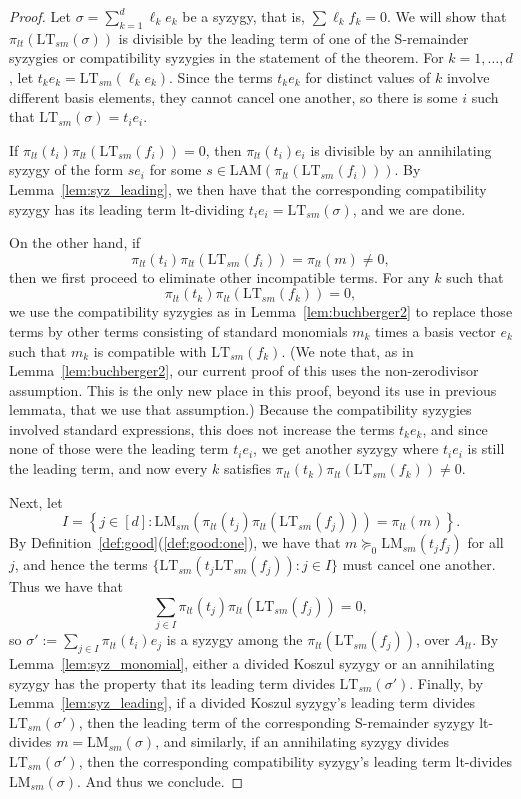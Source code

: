 \documentclass[11pt,reqno]{amsart}
\newcommand{\lmsm}{\text{LM}_{sm}}
\newcommand{\ltsm}{\text{LT}_{sm}}
\newcommand{\piltd}{\pi_{lt}}
\newcommand{\LAM}{\ensuremath{\text{LAM}}}
\theoremstyle{definition}
\numberwithin{equation}{section}
\begin{document}
\begin{proof}
Let $\sigma = \sum_{k=1}^d \ell_k e_k$ be a syzygy, that is, $\sum \ell_k f_k = 0$. We will show that $\pi_{lt}(\ltsm(\sigma))$ is divisible by the leading term of one of the S-remainder syzygies or compatibility syzygies in the statement of the theorem.  %
For $k=1,\dotsc,d$, let $t_k e_k = \ltsm(\ell_k e_k)$. Since the terms $t_k e_k$ for distinct values of $k$ involve different basis elements, they cannot cancel one another, so there is some $i$ such that $\ltsm(\sigma) = t_i e_i$. 

If $\pi_{lt}(t_i) \piltd(\ltsm(f_i)) = 0$, then $\pi_{lt}(t_i) e_i$ is divisible by an annihilating syzygy of the form $s e_i$ for some $s \in \LAM(\pi_{lt}(\ltsm(f_i)))$. By Lemma~\ref{lem:syz_leading}, we then have that the corresponding compatibility syzygy has its leading term lt-dividing $t_i e_i = \ltsm(\sigma)$, and we are done.

On the other hand, if \[
\pi_{lt}(t_i) \piltd(\ltsm(f_i)) = \piltd(m) \neq 0,
\]
then we first proceed to eliminate other incompatible terms. For any $k$ such that 
\[
\pi_{lt}(t_k) \pi_{lt}(\ltsm(f_k)) = 0,
\]
we use the compatibility syzygies as in Lemma~\ref{lem:buchberger2} to replace those terms by other terms consisting of standard monomials $m_k$ times a basis vector $e_k$ such that $m_k$ is compatible with $\ltsm(f_k)$. (We note that, as in Lemma~\ref{lem:buchberger2}, our current proof of this uses the non-zerodivisor assumption. This is the only new place in this proof, beyond its use in previous lemmata, that we use that assumption.) Because the compatibility syzygies involved standard expressions, this does not increase the terms $t_k e_k$, and since none of those were the leading term $t_i e_i$, we get another syzygy where $t_i e_i$ is still the leading term, and now every $k$ satisfies $\pi_{lt}(t_k) \pi_{lt}(\ltsm(f_k)) \neq 0$.

Next, let 
\[
I = \left\{j \in [d] : \lmsm(\pi_{lt}(t_j) \piltd(\ltsm(f_j))) = \piltd(m) \right\}.
\] 
By Definition~\ref{def:good}(\ref{def:good:one}), we have that $m \succeq_0 \lmsm(t_j f_j)$ for all $j$, and hence the terms $\{\ltsm(t_j \ltsm(f_j)) : j \in I \}$ must cancel one another. Thus we have that 
\[
\sum_{j \in I} \pi_{lt}(t_j) \pi_{lt}(\ltsm(f_j)) = 0,
\]
so $\sigma' := \sum_{j \in I} \pi_{lt}(t_i) e_j$ is a syzygy among the $\pi_{lt}(\ltsm(f_j))$, over $A_{lt}$. By Lemma~\ref{lem:syz_monomial}, either a divided Koszul syzygy or an annihilating syzygy has the property that its leading term divides $\ltsm(\sigma')$. Finally, by Lemma~\ref{lem:syz_leading}, if a divided Koszul syzygy's leading term divides $\ltsm(\sigma')$, then the leading term of the corresponding S-remainder syzygy lt-divides $m= \lmsm(\sigma)$, and similarly, if an annihilating syzygy divides $\ltsm(\sigma')$, then the corresponding compatibility syzygy's leading term lt-divides $\lmsm(\sigma)$. And thus we conclude. 
\end{proof}
\end{document}
